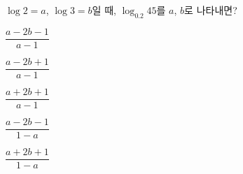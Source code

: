 $\log 2=a$, $\log 3=b$일 때, $\log_{0.2} 45$를 $a$, $b$로 나타내면?
\begin{choices32}{\rule[-3ex]{0pt}{8ex}$\dfrac{a-2b-1}{a-1}$}{\rule[-3ex]{0pt}{8ex}$\dfrac{a-2b+1}{a-1}$}{\rule[-3ex]{0pt}{8ex}$\dfrac{a+2b+1}{a-1}$}{\rule[-3ex]{0pt}{8ex}$\dfrac{a-2b-1}{1-a}$}{\rule[-3ex]{0pt}{8ex}$\dfrac{a+2b+1}{1-a}$}\end{choices32}

